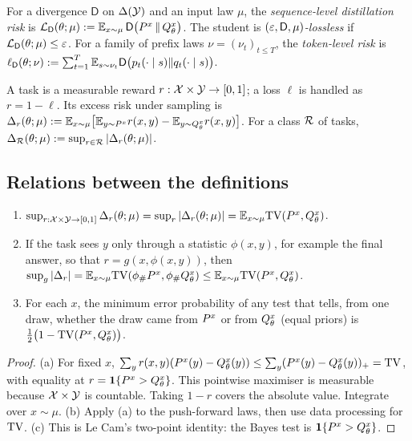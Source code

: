 \begin{definition}\label{def:risk}
For a divergence $\mathsf D$ on $\Delta(\mathcal{Y})$ and an input law $\mu$, the \emph{sequence-level
distillation risk} is
$\mathcal{L}_{\mathsf D}(\theta;\mu):=\mathbb{E}_{x\sim\mu}\,\mathsf D\big(P^{x}\,\|\,Q^{x}_{\theta}\big)$.
The student is \emph{$(\varepsilon,\mathsf D,\mu)$-lossless} if $\mathcal{L}_{\mathsf D}(\theta;\mu)\le\varepsilon$.
For a family of prefix laws $\nu=(\nu_t)_{t\le T}$, the \emph{token-level risk} is
$\ell_{\mathsf D}(\theta;\nu):=\sum_{t=1}^T\mathbb{E}_{s\sim\nu_t}\mathsf D\big(p_t(\cdot\mid s)\|q_t(\cdot\mid s)\big)$.
\end{definition}

\begin{definition}\label{def:task}
A task is a measurable reward $r:\mathcal{X}\times\mathcal{Y}\to[0,1]$; a loss $\ell$ is handled as $r=1-\ell$.
Its excess risk under sampling is
$\Delta_r(\theta;\mu):=\mathbb{E}_{x\sim\mu}\big[\mathbb{E}_{y\sim P^{x}}r(x,y)-\mathbb{E}_{y\sim Q^{x}_{\theta}}r(x,y)\big]$.
For a class $\mathcal{R}$ of tasks, $\Delta_{\mathcal{R}}(\theta;\mu):=\sup_{r\in\mathcal{R}}|\Delta_r(\theta;\mu)|$.
\end{definition}

\subsection{Relations between the definitions}

\begin{proposition}\label{prop:tv-task}
\Pv
\begin{enumerate}[label=(\alph*),nosep]
\item $\sup_{r:\mathcal{X}\times\mathcal{Y}\to[0,1]}\Delta_r(\theta;\mu)=\sup_{r}|\Delta_r(\theta;\mu)|=\mathbb{E}_{x\sim\mu}\mathrm{TV}(P^{x},Q^{x}_{\theta})$.
\item If the task sees $y$ only through a statistic $\phi(x,y)$, for example the final answer, so that
$r=g(x,\phi(x,y))$, then
$\sup_g|\Delta_r|=\mathbb{E}_{x\sim\mu}\mathrm{TV}(\phi_\#P^{x},\phi_\#Q^{x}_{\theta})\le\mathbb{E}_{x\sim\mu}\mathrm{TV}(P^{x},Q^{x}_{\theta})$.
\item For each $x$, the minimum error probability of any test that tells, from one draw, whether the
draw came from $P^{x}$ or from $Q^{x}_{\theta}$ (equal priors) is $\frac12\big(1-\mathrm{TV}(P^{x},Q^{x}_{\theta})\big)$.
\end{enumerate}
\end{proposition}
\begin{proof}
(a) For fixed $x$, $\sum_y r(x,y)(P^{x}(y)-Q^{x}_{\theta}(y))\le\sum_y(P^{x}(y)-Q^{x}_{\theta}(y))_+=\mathrm{TV}$, with equality at
$r=\mathbf{1}\{P^{x}>Q^{x}_{\theta}\}$. This pointwise maximiser is measurable because $\mathcal{X}\times\mathcal{Y}$ is countable.
Taking $1-r$ covers the absolute value. Integrate over $x\sim\mu$.
(b) Apply (a) to the push-forward laws, then use data processing for $\mathrm{TV}$.
(c) This is Le Cam's two-point identity: the Bayes test is $\mathbf{1}\{P^{x}>Q^{x}_{\theta}\}$.
\end{proof}

